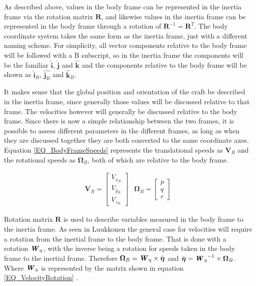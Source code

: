 As described above, values in the body frame can be represented in the inertia frame via the rotation matrix $\textbf{R}$, and likewise values in the inertia frame can be represented in the body frame through a rotation of $\textbf{R}^{-1} = \textbf{R}^T$. The body coordinate system takes the same form as the inertia frame, just with a different naming scheme. For simplicity, all vector components relative to the body frame will be followed with a B subscript, so in the inertia frame the components will be the familiar $\hat{\textbf{i}}$, $\hat{\textbf{j}}$ and $\hat{\textbf{k}}$ and the components relative to the body frame will be shown as $\hat{\textbf{i}}_B$, $\hat{\textbf{j}_B}$ and $\hat{\textbf{k}}_B$.

It makes sense that the global position and orientation of the craft be described in the inertia frame, since generally those values will be discussed relative to that frame. The velocities however will generally be discussed relative to the body frame. Since there is now a simple relationship between the two frames, it is possible to assess different parameters in the different frames, as long as when they are discussed together they are both converted to the same coordinate axes. Equation \eqref{EQ_BodyFrameSpeeds} represents the translational speeds as $\textbf{V}_B$ and the rotational speeds as $\boldsymbol{\Omega}_B$, both of which are relative to the body frame.

\begin{eqnarray}
\textbf{V}_B = 
\begin{bmatrix}
V_{x_B}\\
V_{y_B}\\
V_{z_B}
\end{bmatrix}&
\boldsymbol{\Omega}_B = 
\begin{bmatrix}
p\\
q\\
r
\end{bmatrix}
\label{EQ_BodyFrameSpeeds}
\end{eqnarray}

Rotation matrix $\textbf{R}$ is used to describe variables measured in the body frame to the inertia frame. As seen in Luukkonen \cite{Luukkonen} the general case for velocities will require a rotation from the inertial frame to the body frame. That is done with a rotation $\textbf{\textit{W}}_\eta$, with the inverse being a rotation for speeds taken in the body frame to the inertial frame. Therefore $\boldsymbol{\Omega}_B = \textbf{\textit{W}}_\eta \times \dot{\boldsymbol{\eta}}$ and $\dot{\boldsymbol{\eta}} = {\textbf{\textit{W}}_\eta}^{-1} \times \boldsymbol{\Omega}_B$. Where $\textbf{\textit{W}}_\eta$ is represented by the matrix shown in equation \ref{EQ_VelocityRotation} \cite{Luukkonen, Modelling}.

